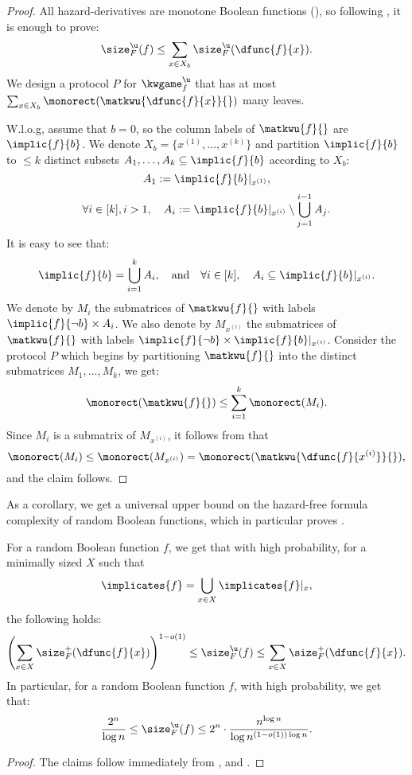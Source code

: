 \documentclass[acmsmall, nonacm, authorversion]{acmart}
\begin{document}
\begin{proof}
All hazard-derivatives are monotone Boolean functions (), so following , it is enough to prove:
\[
\size_{F}^\u(f)\le \sum_{x\in X_b}\size_{F}^{\u}(\dfunc{f}{x}).
\]
We design a protocol $P$ for $\kwgame_f^\u$ that has at most $\sum_{x\in X_b}\monorect(\matkwu{\dfunc{f}{x}}{})$ many leaves.

W.l.o.g, assume that $b=0$, so the column labels of $\matkwu{f}{}$  are $\implic{f}{b}$. We denote $X_b=\{x^{(1)},\dots, x^{(k)}\}$ and partition $\implic{f}{b}$ to $\le k$ distinct subsets $A_1,\dots, A_k \subseteq \implic{f}{b}$ according to $X_b$:
\[
A_1:=\implic{f}{b}|_{x^{(1)}},
\]
\[
\forall i\in [k], i>1, \quad A_i:=\implic{f}{b}|_{x^{(i)}} \setminus \bigcup_{j=1}^{i-1}A_{j}.
\]
It is easy to see that: 
\[
\implic{f}{b}=\bigcup_{i=1}^kA_{i}, \quad \text{and} \quad  \forall i\in [k], \quad A_i\subseteq \implic{f}{b}|_{x^{(i)}}.
\]
We denote by $M_i$ the submatrices of $\matkwu{f}{}$ with labels $\implic{f}{\neg b} \times A_i$. We also denote by $M_{x^{(i)}}$ the submatrices of $\matkwu{f}{}$ with labels $\implic{f}{\neg b} \times \implic{f}{b}|_{x^{(i)}}$. Consider the protocol $P$ which begins by partitioning $\matkwu{f}{}$ into the distinct submatrices $M_1,\dots, M_k$, we get:
\[
\monorect(\matkwu{f}{})\le \sum_{i=1}^{k}\monorect(M_i).
\]
Since $M_i$ is a submatrix of $M_{x^{(i)}}$, it follows from  that 
\[
\monorect(M_i)\le \monorect(M_{x^{(i)}})=\monorect(\matkwu{\dfunc{f}{x^{(i)}}}{}),
\]
and the claim follows.
\end{proof}

As a corollary, we get a universal upper bound on the hazard-free formula complexity of random Boolean functions, which in particular proves .

\begin{theorem}
    \label{thm:ub-tight}
For a random Boolean function $f$, we get that with high probability, for a minimally sized $X$ such that 
\[
\implicates{f}=\bigcup_{x\in X}\implicates{f}|_x,
\]
the following holds:
\[
\left(\sum_{x\in X}\size_{F}^{+}(\dfunc{f}{x})\right)^{1-o(1)}\leq \size_{F}^\u(f)\le \sum_{x\in X}\size_{F}^{+}(\dfunc{f}{x}).
\]
In particular, for a random Boolean function $f$, with high probability, we get that:
\[
\frac{2^n}{\log n}\leq \size_{F}^\u(f)  \leq 2^n\cdot \frac{n^{\log n}}{\log n ^{(1-o(1))\log n}}.
\]
\end{theorem}
\begin{proof}
The claims follow immediately from ,  and . 
\end{proof}
\end{document}
